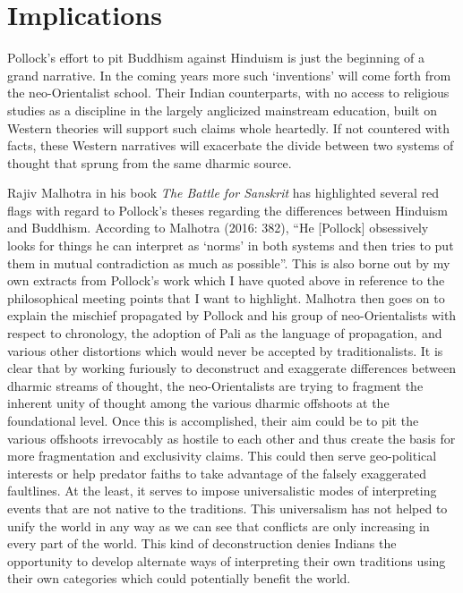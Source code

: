\vspace{-.3cm}

\section*{Implications}

Pollock’s effort to pit Buddhism against Hinduism is just the beginning of a grand narrative. In the coming years more such ‘inventions’ will come forth from the neo-Orientalist school. Their Indian counterparts, with no access to religious studies as a discipline in the largely anglicized mainstream education, built on Western theories will support such claims whole heartedly. If not countered with facts, these Western narratives will exacerbate the divide between two systems of thought that sprung from the same dharmic source.

Rajiv Malhotra in his book \textit{The Battle for Sanskrit} has highlighted several red flags with regard to Pollock’s theses regarding the differences between Hinduism and Buddhism. According to Malhotra (2016: 382), “He [Pollock] obsessively looks for things he can interpret as ‘norms’ in both systems and then tries to put them in mutual contradiction as much as possible”. This is also borne out by my own extracts from Pollock’s work which I have quoted above in reference to the philosophical meeting points that I want to highlight. Malhotra then goes on to explain the mischief propagated by Pollock and his group of neo-Orientalists with respect to chronology, the adoption of Pali as the language of propagation, and various other distortions which would never be accepted by traditionalists. It is clear that by working furiously to deconstruct and exaggerate differences between dharmic streams of thought, the neo-Orientalists are trying to fragment the inherent unity of thought among the various dharmic offshoots at the foundational level. Once this is accomplished, their aim could be to pit the various offshoots irrevocably as hostile to each other and thus create the basis for more fragmentation and exclusivity claims. This could then serve geo-political interests or help predator faiths to take advantage of the falsely exaggerated faultlines. At the least, it serves to impose universalistic modes of interpreting events that are not native to the traditions. This universalism has not helped to unify the world in any way as we can see that conflicts are only increasing in every part of the world. This kind of deconstruction denies Indians the opportunity to develop alternate ways of interpreting their own traditions using their own categories which could potentially benefit the world.

